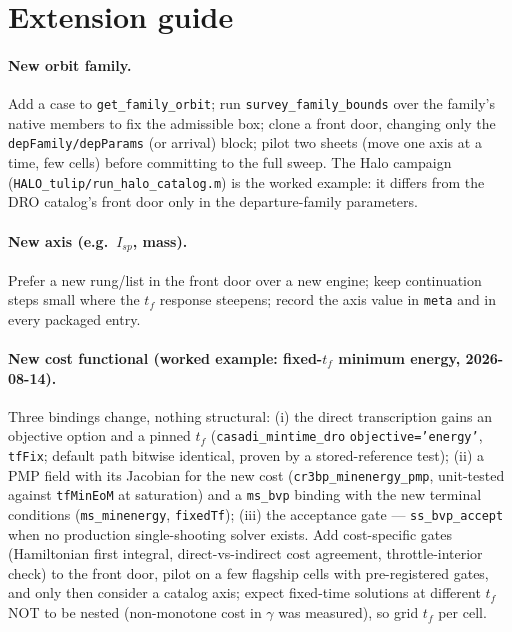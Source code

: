 \documentclass[11pt]{article}
\begin{document}
\section{Extension guide}

\paragraph{New orbit family.} Add a case to \texttt{get\_family\_orbit};
run \texttt{survey\_family\_bounds} over the family's native members to fix
the admissible box; clone a front door, changing only the
\texttt{depFamily/depParams} (or arrival) block; pilot two sheets (move one
axis at a time, few cells) before committing to the full sweep. The Halo
campaign (\texttt{HALO\_tulip/run\_halo\_catalog.m}) is the worked
example: it differs from the DRO catalog's front door only in the
departure-family parameters.

\paragraph{New axis (e.g.\ $I_{sp}$, mass).} Prefer a new rung/list in the
front door over a new engine; keep continuation steps small where the
$t_f$ response steepens; record the axis value in \texttt{meta} and in
every packaged entry.

\paragraph{New cost functional (worked example: fixed-$t_f$ minimum energy,
2026-08-14).} Three bindings change, nothing structural: (i) the direct
transcription gains an objective option and a pinned $t_f$
(\texttt{casadi\_mintime\_dro} \texttt{objective='energy'}, \texttt{tfFix};
default path bitwise identical, proven by a stored-reference test); (ii) a
PMP field with its Jacobian for the new cost (\texttt{cr3bp\_minenergy\_pmp},
unit-tested against \texttt{tfMinEoM} at saturation) and a
\texttt{ms\_bvp} binding with the new terminal conditions
(\texttt{ms\_minenergy}, \texttt{fixedTf}); (iii) the acceptance gate ---
\texttt{ss\_bvp\_accept} when no production single-shooting solver exists.
Add cost-specific gates (Hamiltonian first integral, direct-vs-indirect
cost agreement, throttle-interior check) to the front door, pilot on a few
flagship cells with pre-registered gates, and only then consider a catalog
axis; expect fixed-time solutions at different $t_f$ NOT to be nested
(non-monotone cost in $\gamma$ was measured), so grid $t_f$ per cell.
\end{document}
